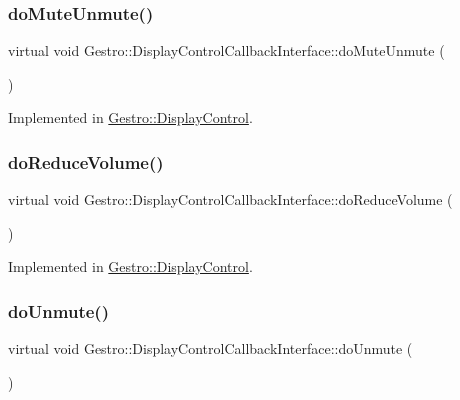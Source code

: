 \subsubsection{\texorpdfstring{do\+Mute\+Unmute()}{doMuteUnmute()}}
{\footnotesize\ttfamily virtual void Gestro\+::\+Display\+Control\+Callback\+Interface\+::do\+Mute\+Unmute (\begin{DoxyParamCaption}{ }\end{DoxyParamCaption})\hspace{0.3cm}{\ttfamily [pure virtual]}}



Implemented in \hyperlink{classGestro_1_1DisplayControl_a25f685ea6bf001e53c7d17410f2a24ea}{Gestro\+::\+Display\+Control}.

\mbox{\label{classGestro_1_1DisplayControlCallbackInterface_a8648fb64585379393917e6b50e348070}} 
\subsubsection{\texorpdfstring{do\+Reduce\+Volume()}{doReduceVolume()}}
{\footnotesize\ttfamily virtual void Gestro\+::\+Display\+Control\+Callback\+Interface\+::do\+Reduce\+Volume (\begin{DoxyParamCaption}{ }\end{DoxyParamCaption})\hspace{0.3cm}{\ttfamily [pure virtual]}}



Implemented in \hyperlink{classGestro_1_1DisplayControl_a874fa3f6b3e4cf465db62a4eba1c1dd1}{Gestro\+::\+Display\+Control}.

\mbox{\label{classGestro_1_1DisplayControlCallbackInterface_a74ddca7b1ef399a41f6025163407bb4d}} 
\subsubsection{\texorpdfstring{do\+Unmute()}{doUnmute()}}
{\footnotesize\ttfamily virtual void Gestro\+::\+Display\+Control\+Callback\+Interface\+::do\+Unmute (\begin{DoxyParamCaption}{ }\end{DoxyParamCaption})\hspace{0.3cm}{\ttfamily [pure virtual]}}



